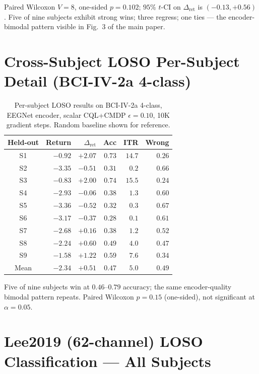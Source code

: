 \documentclass[conference]{IEEEtran}
\newcommand{\bcia}{BCI-IV-2a}
\newcommand{\cql}{CQL}
\begin{document}
Paired Wilcoxon $V\!=\!8$, one-sided $p\!=\!0.102$; $95\%$
$t$-CI on $\Delta_{\text{ret}}$ is $(-0.13, +0.56)$. Five of nine
subjects exhibit strong wins; three regress; one ties --- the
encoder-bimodal pattern visible in Fig.~3 of the main paper.

\section{Cross-Subject LOSO Per-Subject Detail (\bcia{} 4-class)}

\begin{table}[h]
\centering
\caption{Per-subject LOSO results on \bcia{} 4-class, EEGNet
encoder, scalar \cql{}+CMDP $\epsilon\!=\!0.10$, 10K gradient
steps. Random baseline shown for reference.}
\label{tab:sup:bci2a_loso}
\footnotesize
\begin{tabular}{c r r r r r}
\toprule
Held-out & Return & $\Delta_{\text{ret}}$ & Acc & ITR & Wrong \\
\midrule
S1 & $-0.92$ & $\mathbf{+2.07}$ & $0.73$ & $14.7$ & $0.26$ \\
S2 & $-3.35$ & $-0.51$ & $0.31$ & $0.2$ & $0.66$ \\
S3 & $-0.83$ & $\mathbf{+2.00}$ & $0.74$ & $15.5$ & $0.24$ \\
S4 & $-2.93$ & $-0.06$ & $0.38$ & $1.3$ & $0.60$ \\
S5 & $-3.36$ & $-0.52$ & $0.32$ & $0.3$ & $0.67$ \\
S6 & $-3.17$ & $-0.37$ & $0.28$ & $0.1$ & $0.61$ \\
S7 & $-2.68$ & $\mathbf{+0.16}$ & $0.38$ & $1.2$ & $0.52$ \\
S8 & $-2.24$ & $\mathbf{+0.60}$ & $0.49$ & $4.0$ & $0.47$ \\
S9 & $-1.58$ & $\mathbf{+1.22}$ & $0.59$ & $7.6$ & $0.34$ \\
\midrule
Mean & $-2.34$ & $+0.51$ & $0.47$ & $5.0$ & $0.49$ \\
\bottomrule
\end{tabular}
\end{table}

Five of nine subjects win at $0.46$--$0.79$ accuracy; the same
encoder-quality bimodal pattern repeats. Paired Wilcoxon
$p\!=\!0.15$ (one-sided), not significant at $\alpha\!=\!0.05$.

\section{Lee2019 (62-channel) LOSO Classification --- All Subjects}
\end{document}
